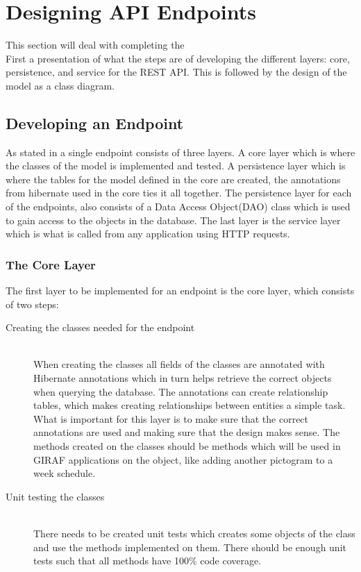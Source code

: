 \section{Designing API Endpoints}
This section will deal with completing the  \\

First a presentation of what the steps are of developing the different layers: core, persistence, and service for the REST API.
This is followed by the design of the model as a class diagram.

\subsection{Developing an Endpoint}

As stated in  a single endpoint consists of three layers.
A core layer which is where the classes of the model is implemented and tested.
A persistence layer which is where the tables for the model defined in the core are created, the annotations from hibernate used in the core ties it all together.
The persistence layer for each of the endpoints, also consists of a Data Access Object(DAO) class which is used to gain access to the objects in the database. 
The last layer is the service layer which is what is called from any application using HTTP requests.

\subsubsection{The Core Layer}
The first layer to be implemented for an endpoint is the core layer, which consists of two steps: 
\begin{description}
	\item[Creating the classes needed for the endpoint] \hfill \\
	When creating the classes all fields of the classes are annotated with Hibernate annotations which in turn helps retrieve the correct objects when querying the database.
	The annotations can create relationship tables, which makes creating relationships between entities a simple task.
	What is important for this layer is to make sure that the correct annotations are used and making sure that the design makes sense.
	The methods created on the classes should be methods which will be used in GIRAF applications on the object, like adding another pictogram to a week schedule.
	\item[Unit testing the classes] \hfill \\ 
	There needs to be created unit tests which creates some objects of the class and use the methods implemented on them.
	There should be enough unit tests such that all methods have 100\% code coverage.
\end{description}


